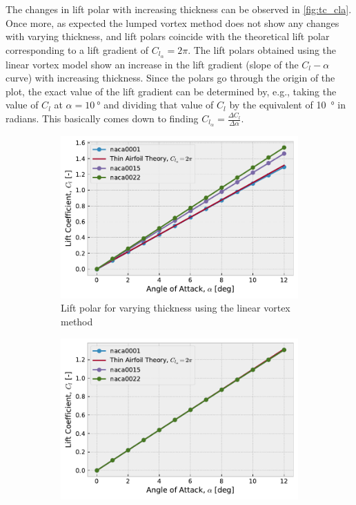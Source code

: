 The changes in lift polar with increasing thickness can be observed in
\autoref{fig:tc_cla}. Once more, as expected the lumped vortex method does not
show any changes with varying thickness, and lift polars coincide with the
theoretical lift polar corresponding to a lift gradient of  $C_{l_\alpha} =
2\pi$.
The lift polars obtained using the linear vortex model show an increase in the
lift gradient (slope of the $C_l-\alpha$ curve) with increasing thickness. Since
the polars go through the origin of the plot, the
exact value of the lift gradient can be determined by, e.g., taking the value of
$C_l$ at $\alpha=\SI{10}{\degree}$ and dividing that value of $C_l$ by the
equivalent of \SI{10}{\degree} in radians. This basically comes down to finding
$C_{l_\alpha}=\frac{\Delta C_l}{\Delta \alpha}$.

\begin{figure}[h]
  \centering
  \begin{subfigure}{.5\textwidth}
    \centering
    \captionsetup{width=.8\linewidth}
    \includegraphics[width=.9\linewidth]{static/thick_tc_cla.pdf}
    \caption{\centering Lift polar for varying thickness using the linear vortex method}
    \label{fig:thick_tc_cla}
  \end{subfigure}\hfill%
  \begin{subfigure}{.5\textwidth}
    \centering
    \captionsetup{width=.8\linewidth}
    \includegraphics[width=.9\linewidth]{static/thin_tc_cla.pdf}

\end{subfigure}
\end{figure}

